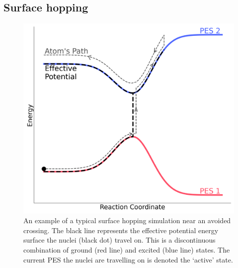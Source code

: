\subsection{Surface hopping}
\begin{figure}[htp]
  \includegraphics[width=\textwidth]{../img/SH_hop.png}
	\caption{\label{fig:SH_diag}An example of a typical surface hopping simulation near an avoided crossing. The black line represents the {effective} potential energy surface the nuclei (black dot) travel on. This is a discontinuous combination of ground (red line) and excited (blue line) states. The current PES the nuclei are travelling on is denoted the `active' state.}
\end{figure}
